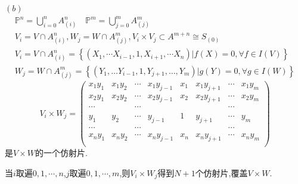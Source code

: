 \documentclass[UTF8]{book}
\begin{document}
		$ (b) $
		\begin{equation*}\begin{array}{l}
		\mathbb{P} ^{n}=\bigcup_{i=0}^{n} A_{(i)}^{n} \quad \mathbb{P} ^{m}=\bigcup_{j=0}^{m} A_{(j)}^{m}\\
		V_{i} = V \cap A_{(i)}^{n},W_{j} = W \cap A_{(j)}^{m},V_{i} \times V_{j} \subset A^{m+n} \cong S_{(0)}\\	
		V_{i}=V \cap A^{n}_{(i)}=\left\{\left(X_{1}, \cdots X_{i-1},1, X_{i +1}, \cdots X_{n}\right) | f(X)=0, \forall f \in I(V)\right\} \\
		W_{j}=W \cap A_{(j)}^{m}=\left\{\left(Y_{1}, \ldots Y_{i-1}, 1, Y_{j+1}, \ldots, Y_{m}\right) | g(Y)=0, \forall g \in I(W)\right\}\end{array}
		\end{equation*}
		\begin{equation*}
		V_{i} \times W_{j} =  \left(\begin{array}{cccccccc}
		x_{1}y_{1}&x_{1}y_{2}&\cdots&x_{1}y_{j-1}&x_{1}&x_{1}y_{j+1}&\cdots&x_{1}y_{m} \\
		x_{2}y_{1}&x_{2}y_{2}&\cdots&x_{2}y_{j-1}&x_{2}&x_{2}y_{j+1}&\cdots&x_{2}y_{m} \\
		\cdots & &\cdots& & & &\cdots&  \\
		y_{1}&y_{2}&\cdots&y_{j-1}&1&y_{j+1}&\cdots&y_{m} \\
		\cdots & &\cdots& & & &\cdots&  \\	
		x_{n}y_{1}&x_{n}y_{2}&\cdots&x_{n}y_{j-1}&x_{n}&x_{n}y_{j+1}&\cdots&x_{n}y_{m} \\
		\end{array}\right)\end{equation*}
		是$ V \times W$的一个仿射片.
		
		当$ i $取遍$ 0,1,\cdots,n $,$ j $取遍$ 0,1,\cdots,m $,则$ V_{i} \times W_{j} $得到$ N+1 $个仿射片,覆盖$ V \times W$.
			
			
\end{document}

